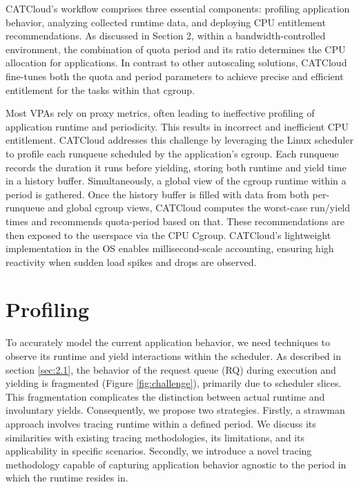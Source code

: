 CATCloud's workflow comprises three essential components: profiling application behavior, analyzing collected runtime data, and deploying CPU entitlement recommendations. As discussed in Section 2, within a bandwidth-controlled environment, the combination of quota period and its ratio determines the CPU allocation for applications. In contrast to other autoscaling solutions, CATCloud fine-tunes both the quota and period parameters to achieve precise and efficient entitlement for the tasks within that cgroup.


Most VPAs rely on proxy metrics, often leading to ineffective profiling of application runtime and periodicity. This results in incorrect and inefficient CPU entitlement. CATCloud addresses this challenge by leveraging the Linux scheduler to profile each runqueue scheduled by the application's cgroup. Each runqueue records the duration it runs before yielding, storing both runtime and yield time in a history buffer. Simultaneously, a global view of the cgroup runtime within a period is gathered. Once the history buffer is filled with data from both per-runqueue and global cgroup views, CATCloud computes the worst-case run/yield times and recommends quota-period based on that. These recommendations are then exposed to the userspace via the CPU Cgroup. CATCloud's lightweight implementation in the OS enables millisecond-scale accounting, ensuring high reactivity when sudden load spikes and drops are observed.

\section{Profiling}
To accurately model the current application behavior, we need techniques to observe its runtime and yield interactions within the scheduler. As described in section \ref{sec:2.1}, the behavior of the request queue (RQ) during execution and yielding is fragmented (Figure \ref{fig:challenge}), primarily due to scheduler slices. This fragmentation complicates the distinction between actual runtime and involuntary yields. Consequently, we propose two strategies. Firstly, a strawman approach involves tracing runtime within a defined period. We discuss its similarities with existing tracing methodologies, its limitations, and its applicability in specific scenarios. Secondly, we introduce a novel tracing methodology capable of capturing application behavior agnostic to the period in which the runtime resides in.

